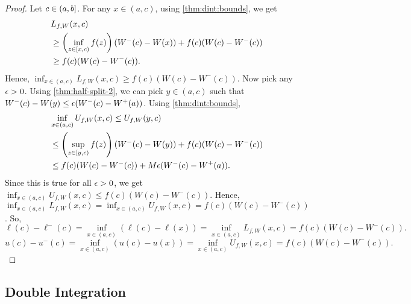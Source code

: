\documentclass[a4paper,12pt,fleqn]{article}
\begin{document}
\begin{proof}
Let $c \in (a, b]$.
For any $x \in (a, c)$, using \cref{thm:dint:bounds}, we get
\begin{align*}
& L_{f,W}(x, c)
\\ &\ge \left(\inf_{z \in [x, c)} f(z)\right)(W^-(c)-W(x)) + f(c)(W(c)-W^-(c))
\\ &\ge f(c)(W(c)-W^-(c)).
\end{align*}
Hence, $\inf_{x \in (a, c)} L_{f,W}(x, c) \ge f(c)(W(c)-W^-(c))$.
Now pick any $\epsilon > 0$.
Using \cref{thm:half-split-2}, we can pick $y \in (a, c)$
such that $W^-(c) - W(y) \le \epsilon(W^-(c)-W^+(a))$.
Using \cref{thm:dint:bounds},
\begin{align*}
& \inf_{x \in (a, c)} U_{f,W}(x, c) \le U_{f,W}(y, c)
\\ &\le \left(\sup_{z \in [y, c)} f(z)\right)(W^-(c)-W(y)) + f(c)(W(c)-W^-(c))
\\ &\le f(c)(W(c)-W^-(c)) + M\epsilon(W^-(c)-W^+(a)).
\end{align*}
Since this is true for all $\epsilon > 0$, we get
$\inf_{x \in (a, c)} U_{f,W}(x, c) \le f(c)(W(c)-W^-(c))$.
Hence, $\inf_{x \in (a, c)} L_{f,W}(x, c) = \inf_{x \in (a, c)} U_{f,W}(x, c) = f(c)(W(c)-W^-(c))$.
So,
\[ \ell(c) - \ell^-(c) = \inf_{x \in (a, c)} (\ell(c) - \ell(x))
    = \inf_{x \in (a, c)} L_{f,W}(x, c) = f(c)(W(c)-W^-(c)). \]
\[ u(c) - u^-(c) = \inf_{x \in (a, c)} (u(c) - u(x))
    = \inf_{x \in (a, c)} U_{f,W}(x, c) = f(c)(W(c)-W^-(c)). \]
\end{proof}

\subsection{Double Integration}
\end{document}
